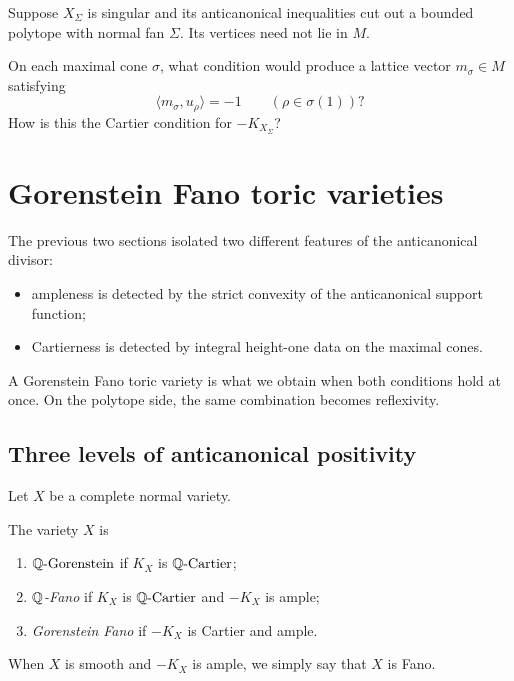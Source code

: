 \begin{prediction}
Suppose \(X_\Sigma\) is singular and its anticanonical inequalities
cut out a bounded polytope with normal fan \(\Sigma\). Its vertices
need not lie in \(M\).

On each maximal cone \(\sigma\), what condition would produce a lattice
vector \(m_\sigma\in M\) satisfying
\[
\langle m_\sigma,u_\rho\rangle=-1
\qquad
(\rho\in\sigma(1))?
\]
How is this the Cartier condition for \(-K_{X_\Sigma}\)?
\end{prediction}

\section{Gorenstein Fano toric varieties}
\label{sec:gorenstein-fano-toric-varieties}

The previous two sections isolated two different features of the
anticanonical divisor:

\begin{itemize}
\item ampleness is detected by the strict convexity of the
anticanonical support function;

\item Cartierness is detected by integral height-one data on the
maximal cones.
\end{itemize}

A Gorenstein Fano toric variety is what we obtain when both conditions
hold at once. On the polytope side, the same combination becomes
reflexivity.

\subsection{Three levels of anticanonical positivity}

Let \(X\) be a complete normal variety.

\begin{definition}
The variety \(X\) is

\begin{enumerate}[label=(\alph*),wide=0pt]
\item \emph{\(\mathbb{Q}\text{-Gorenstein}\)} if \(K_X\) is \(\mathbb{Q}\text{-Cartier}\);

\item \emph{\(\mathbb{Q}\)-Fano} if \(K_X\) is \(\mathbb{Q}\text{-Cartier}\) and \(-K_X\)
is ample;

\item \emph{Gorenstein Fano} if \(-K_X\) is Cartier and ample.
\end{enumerate}

When \(X\) is smooth and \(-K_X\) is ample, we simply say that \(X\)
is Fano.
\end{definition}

